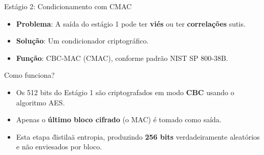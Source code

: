 \begin{frame}{Estágio 2: Condicionamento com CMAC}
    \begin{itemize}
        \item \textbf{Problema}: A saída do estágio 1 pode ter \textbf{viés} ou ter \textbf{correlações} sutis.
        \item \textbf{Solução}: Um condicionador criptográfico.
        \item \textbf{Função}: CBC-MAC (CMAC), conforme padrão NIST SP 800-38B.
    \end{itemize}



    \begin{block}{Como funciona?}
        \begin{itemize}
            \item Os 512 bits do Estágio 1 são criptografados em modo \textbf{CBC} usando o algoritmo AES.
            \item Apenas o \textbf{último bloco cifrado} (o MAC) é tomado como saída.
            \item Esta etapa \"distila\" a entropia, produzindo \textbf{256 bits} verdadeiramente aleatórios e não enviesados por bloco.
        \end{itemize}
    \end{block}
\end{frame}

